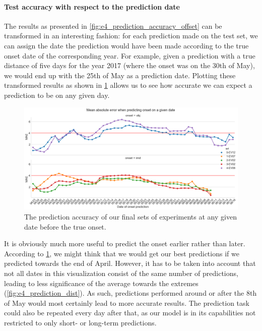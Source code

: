 \paragraph{Test accuracy with respect to the prediction date}
The results as presented in \cref{fig:e4_prediction_accuracy_offset} can be transformed in an interesting fashion: for each prediction made on the test set, we can assign the date the prediction would have been made according to the true onset date of the corresponding year. For example, given a prediction with a true distance of five days for the year 2017 (where the onset was on the 30th of May), we would end up with the 25th of May as a prediction date. Plotting these transformed results as shown in \cref{fig:e4_prediction_accuracy_dates} allows us to see how accurate we can expect a prediction to be on any given day.

\begin{figure}[h!]
  \centering
  \includegraphics[width=\linewidth]{./99_appendix/img/prediction_accuracy_dates}
  \caption{The prediction accuracy of our final sets of experiments at any given date before the true onset.}
  \label{fig:e4_prediction_accuracy_dates}
\end{figure}

It is obviously much more useful to predict the onset earlier rather than later. According to \cref{fig:e4_prediction_accuracy_dates}, we might think that we would get our best predictions if we predicted towards the end of April. However, it has to be taken into account that not all dates in this visualization consist of the same number of predictions, leading to less significance of the average towards the extremes (\cref{fig:e4_prediction_dist}). As such, predictions performed around or after the 8th of May would most certainly lead to more accurate results. The prediction task could also be repeated every day after that, as our model is in its capabilities not restricted to only short- or long-term predictions.


